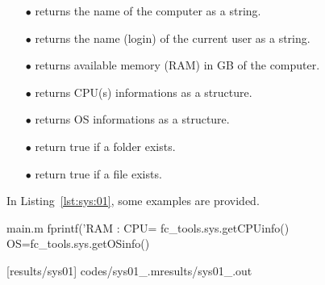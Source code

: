 
\begin{itemize}
\item[$\bullet$]  returns the name of the computer as a string.
\item[$\bullet$]  returns the name (login) of the current user as a string.
\item[$\bullet$]  returns available memory (RAM) in GB of the computer.
\item[$\bullet$]  returns CPU(s) informations as a structure.
\item[$\bullet$]  returns OS informations as a structure.
\item[$\bullet$]  return true if a folder exists.
\item[$\bullet$]  return true if a file exists.
\end{itemize}

In Listing~\ref{lst:sys:01}, some examples are provided.
\begin{filecontents*}{main.m}
fprintf('RAM : %
CPU= fc_tools.sys.getCPUinfo()
OS=fc_tools.sys.getOSinfo()
\end{filecontents*}
[results/sys01]
%
                      {codes/sys01_\fccmdname\fccmdversionabr.m}{results/sys01_\fccmdname\fccmdversionabr.out}
